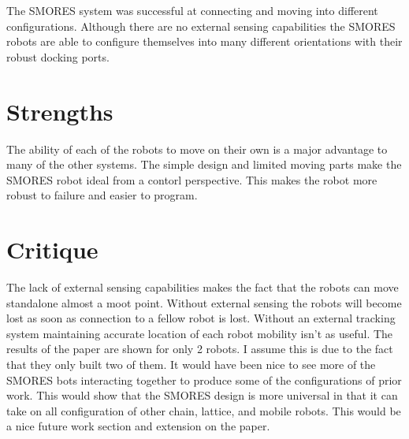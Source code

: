 \documentclass{article}
\begin{document}
The SMORES system was successful at connecting and moving into different configurations. Although there are no external sensing capabilities the SMORES robots are able to configure themselves into many different orientations with their robust docking ports.
\section*{Strengths}
The ability of each of the robots to move on their own is a major advantage to many of the other systems. The simple design and limited moving parts make the SMORES robot ideal from a contorl perspective. This makes the robot more robust to failure and easier to program.
\section*{Critique}
The lack of external sensing capabilities makes the fact that the robots can move standalone almost a moot point. Without external sensing the robots will become lost as soon as connection to a fellow robot is lost. Without an external tracking system maintaining accurate location of each robot mobility isn't as useful. The results of the paper are shown for only 2 robots. I assume this is due to the fact that they only built two of them. It would have been nice to see more of the SMORES bots interacting together to produce some of the configurations of prior work. This would show that the SMORES design is more universal in that it can take on all configuration of other chain, lattice, and mobile robots. This would be a nice future work section and extension on the paper.
\end{document}
